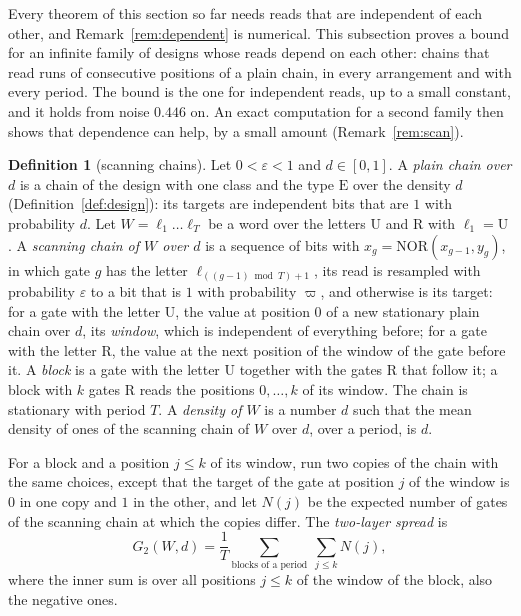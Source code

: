 \documentclass[11pt]{amsart}
\theoremstyle{definition}
\newtheorem{definition}[theorem]{Definition}
\theoremstyle{remark}
\newcommand{\eps}{\varepsilon}
\newcommand{\NOR}{\mathrm{NOR}}
\begin{document}
Every theorem of this section so far needs reads that are independent of each other, and
Remark~\ref{rem:dependent} is numerical. This subsection proves a bound for an infinite family of
designs whose reads depend on each other: chains that read runs of consecutive positions of a
plain chain, in every arrangement and with every period. The bound is the one for independent
reads, up to a small constant, and it holds from noise $0.446$ on. An exact computation for a
second family then shows that dependence can help, by a small amount
(Remark~\ref{rem:scan}).

\begin{definition}[scanning chains]\label{def:scan}
Let $0<\eps<1$ and $d\in[0,1]$. A \emph{plain chain over $d$} is a chain of the design with one
class and the type $\mathrm E$ over the density $d$ (Definition~\ref{def:design}): its targets
are independent bits that are $1$ with probability $d$. Let $W=\ell_1\dots\ell_T$ be a word over
the letters $\mathrm U$ and $\mathrm R$ with $\ell_1=\mathrm U$. A \emph{scanning chain of $W$
over $d$} is a sequence of bits with $x_g=\NOR(x_{g-1},y_g)$, in which gate $g$ has the letter
$\ell_{((g-1)\bmod T)+1}$, its read is resampled with probability $\eps$ to a bit that is $1$
with probability $\varpi$, and otherwise is its target: for a gate with the letter $\mathrm U$,
the value at position $0$ of a new stationary plain chain over $d$, its \emph{window}, which is
independent of everything before; for a gate with the letter $\mathrm R$, the value at the next
position of the window of the gate before it. A \emph{block} is a gate with the letter
$\mathrm U$ together with the gates $\mathrm R$ that follow it; a block with $k$ gates
$\mathrm R$ reads the positions $0,\dots,k$ of its window. The chain is stationary with period
$T$. A \emph{density of $W$} is a number $d$ such that the mean density of ones of the scanning
chain of $W$ over $d$, over a period, is $d$.

For a block and a position $j\le k$ of its window, run two copies of the chain with the same
choices, except that the target of the gate at position $j$ of the window is $0$ in one copy and
$1$ in the other, and let $N(j)$ be the expected number of gates of the scanning chain at which
the copies differ. The \emph{two-layer spread} is
\[
G_2(W,d)=\frac1T\sum_{\text{blocks of a period}}\ \sum_{j\le k}N(j),
\]
where the inner sum is over all positions $j\le k$ of the window of the block, also the negative
ones.
\end{definition}
\end{document}
